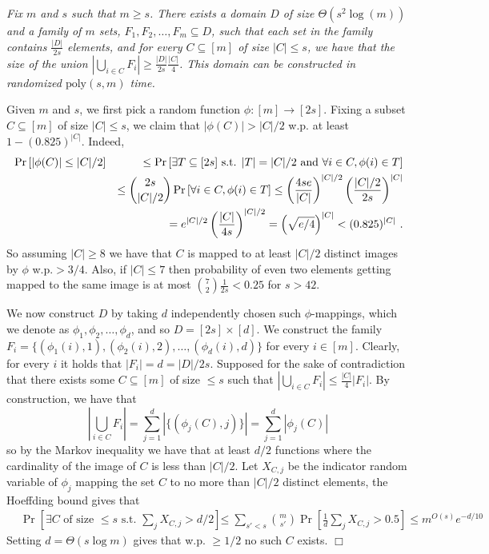 \documentclass[prodmode,acmec]{ec-acmsmall}
\newcommand{\poly}{\ensuremath{\mathrm{poly}}}
\def \QED {\hfill{$\Box$}}
\newenvironment{proofof}[1]{\noindent {\em Proof of #1.  }}{\QED}
\newenvironment{reminderclaim}[1]{\medskip \noindent {\bf Reminder of Claim #1.  }\em}{}
\begin{document}
\begin{reminderclaim}{\ref{clm:FamilyOfSetsWithLargeUnions}}
Fix $m$ and $s$ such that $m\geq s$. There exists a domain $D$ of size $\Theta(s^2\log(m))$ and a family of $m$ sets, $F_1, F_2, \ldots, F_m\subseteq D$, such that each set in the family contains $\tfrac {|D|}{2s}$ elements, and for every $C\subseteq [m]$ of size $|C| \leq s$, we have that the size of the union $\left| \bigcup_{i\in C} F_i \right| \geq \tfrac {|D|}{2s} \tfrac{|C|} 4$. This domain can be constructed in randomized $\poly(s,m)$ time.
\end{reminderclaim}

\medskip

\begin{proofof}{Claim \ref{clm:FamilyOfSetsWithLargeUnions}} Given $m$ and $s$, we first pick a random function $\phi:[m] \to [2s]$. Fixing a subset $C\subseteq [m]$ of size $|C| \leq s$, we claim that $|\phi(C)| > |C|/2$ w.p. at least $1-(0.825)^{|C|}$. Indeed,
\begin{eqnarray*}
& \Pr\left[ |\phi(C)| \leq |C|/2 \right] & \leq \Pr\left[ \exists T\subseteq [2s] \textrm{ s.t. } |T| = |C|/2 \textrm{ and } \forall i \in C, \phi(i)\in T\right] \cr
&& \leq \binom{2s} {|C|/2} \Pr\left[\forall i \in C, \phi(i)\in T\right] \leq \left(\frac {4se}{|C|}\right)^{|C|/2} \left(\frac {|C|/2} {2s}\right)^{|C|} \cr
&& = e^{|C|/2} \left(\frac {|C|} {4s}\right)^{|C|/2} = \left(\sqrt{e/4}\right)^{|C|} < (0.825)^{|C|} \ .
\end{eqnarray*}
So assuming $|C| \geq 8$ we have that $C$ is mapped to at least $|C|/2$ distinct images by $\phi$ w.p.$>3/4$. Also,  if $|C|\leq 7$ then probability of even two elements getting mapped to the same image is at most $\binom{7} {2} \tfrac 1 {2s} < 0.25$ for $s> 42$.

We now construct $D$ by taking $d$ independently chosen such $\phi$-mappings, which we denote as $\phi_1, \phi_2, \ldots, \phi_d$, and so $D = [2s] \times [d]$. We construct the family $F_i = \{(\phi_1(i),1), (\phi_2(i),2), \ldots, (\phi_d(i),d)  \}$ for every $i \in [m]$. Clearly, for every $i$ it holds that $|F_i| = d = |D|/2s$. Supposed for the sake of contradiction that there exists some $C\subseteq [m]$ of size $\leq s$ such that $\left| \bigcup_{i\in C} F_i \right| \leq \tfrac {|C|} 4 |F_i|$. By construction, we have that 
\[\left| \bigcup_{i\in C} F_i \right| = \sum_{j=1}^d \left| \{ (\phi_j(C), j)  \}  \right| = \sum_{j=1}^d |\phi_j(C)|\]
so by the Markov inequality we have that at least $d/2$ functions where the cardinality of the image of $C$ is less than $|C|/2$. Let $X_{C,j}$ be the indicator random variable of $\phi_j$ mapping the set $C$ to no more than $|C|/2$ distinct elements, the Hoeffding bound gives that
\begin{eqnarray*}
& \Pr\left[ \exists C  \textrm{ of size $\leq s$ s.t. } \sum_j X_{C,j} > d/2 \right] &\leq \sum_{s'<s} \binom{m} {s'} \Pr[ \tfrac 1 d \sum_j X_{C,j} > 0.5] \leq m^{O(s)} e^{-d/10} 
\end{eqnarray*}
Setting $d = \Theta(s\log m)$ gives that w.p. $\geq 1/2$ no such $C$ exists.
\end{proofof}
\end{document}
